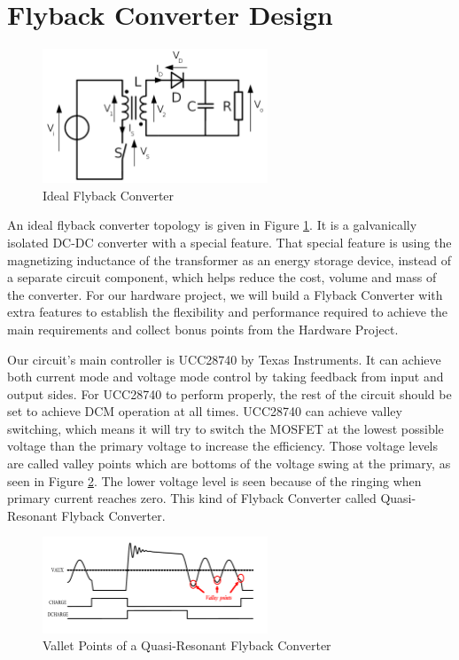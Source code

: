 \section{Flyback Converter Design}

\begin{figure}[H]
\begin{center}
\includegraphics[width=0.6\textwidth]{flybacktop.png}
\caption{Ideal Flyback Converter}
\label{fig:flybacktop}
\end{center}
\end{figure}
An ideal flyback converter topology is given in Figure \ref{fig:flybacktop}. It is a galvanically isolated DC-DC converter with a special feature. That special feature is using the magnetizing inductance of the transformer as an energy storage device, instead of a separate circuit component, which helps reduce the cost, volume and mass of the converter. For our hardware project, we will build a Flyback Converter with extra features to establish the flexibility and performance required to achieve the main requirements and collect bonus points from the Hardware Project. 
\par Our circuit's main controller is UCC28740 by Texas Instruments. It can achieve both current mode and voltage mode control by taking feedback from input and output sides. For UCC28740 to perform properly, the rest of the circuit should be set to achieve DCM operation at all times. UCC28740 can achieve valley switching, which means it will try to switch the MOSFET at the lowest possible voltage than the primary voltage to increase the efficiency. Those voltage levels are called valley points which are bottoms of the voltage swing at the primary, as seen in Figure \ref{fig:valleyswitch}. The lower voltage level is seen because of the ringing when primary current reaches zero. This kind of Flyback Converter called Quasi-Resonant Flyback Converter.

\begin{figure}[H]
\begin{center}
\includegraphics[width=0.6\textwidth]{valleyswitch.png}
\caption{Vallet Points of a Quasi-Resonant Flyback Converter}
\label{fig:valleyswitch}
\end{center}
\end{figure}

